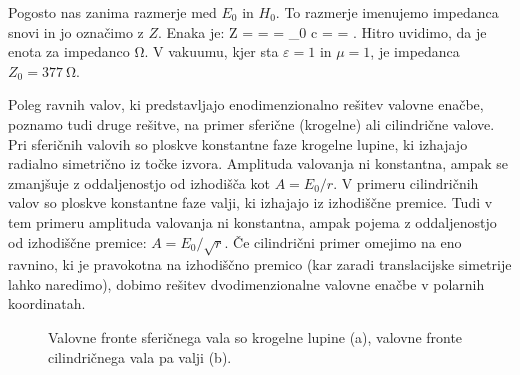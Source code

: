 Pogosto nas zanima razmerje med $E_0$ in $H_0$. To razmerje imenujemo impedanca
snovi in jo označimo z $Z$. Enaka je:
\beq
Z =  =  = \mu \mu_0 c = 
 = .
\label{eq:03_25}
\eeq
Hitro uvidimo, da je enota za impedanco $\si{\ohm}$. V vakuumu, 
kjer sta $\varepsilon = 1$ in $\mu= 1$, je impedanca $Z_0 = 377~\si{\ohm}$.

\begin{remark}
Poleg ravnih valov, ki predstavljajo enodimenzionalno rešitev valovne enačbe, poznamo
tudi druge rešitve, na primer sferične (krogelne) ali cilindrične valove. Pri 
sferičnih valovih so ploskve konstantne faze krogelne lupine, ki izhajajo radialno 
simetrično iz točke izvora. Amplituda valovanja ni konstantna, ampak se zmanjšuje z oddaljenostjo 
od izhodišča kot $A = E_0/r$. V primeru cilindričnih valov so ploskve konstantne
faze valji, ki izhajajo iz izhodiščne premice. Tudi v tem primeru amplituda valovanja ni konstantna,
ampak pojema z oddaljenostjo od izhodiščne premice: $A = E_0/\sqrt{r}$.  Če cilindrični 
primer omejimo na eno ravnino, ki je pravokotna na izhodiščno premico (kar zaradi 
translacijske simetrije lahko naredimo), dobimo rešitev dvodimenzionalne valovne enačbe 
v polarnih koordinatah. 
\begin{figure}[ht]
\centering
\def\svgwidth{100truemm} 

\caption{Valovne fronte sferičnega vala so krogelne lupine (a), valovne fronte
cilindričnega vala pa valji (b).}
\label{fig:03_sfericnival}
\end{figure}
\end{remark}


